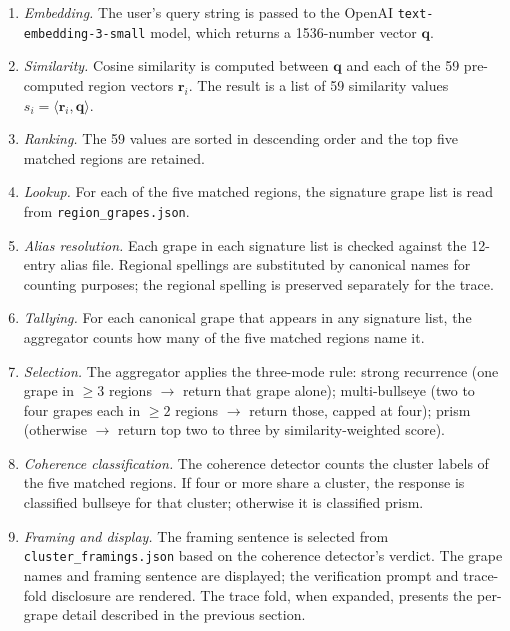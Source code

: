 \documentclass[11pt]{article}
\providecommand{\inner}[2]{\langle #1, #2 \rangle}
\begin{document}
\begin{enumerate}[leftmargin=2em,itemsep=0.2em]
\item \emph{Embedding.} The user's query string is passed to the OpenAI \texttt{text-embedding-3-small} model, which returns a 1536-number vector $\mathbf{q}$.

\item \emph{Similarity.} Cosine similarity is computed between $\mathbf{q}$ and each of the 59 pre-computed region vectors $\mathbf{r}_i$. The result is a list of 59 similarity values $s_i = \inner{\mathbf{r}_i}{\mathbf{q}}$.

\item \emph{Ranking.} The 59 values are sorted in descending order and the top five matched regions are retained.

\item \emph{Lookup.} For each of the five matched regions, the signature grape list is read from \texttt{region\_grapes.json}.

\item \emph{Alias resolution.} Each grape in each signature list is checked against the 12-entry alias file. Regional spellings are substituted by canonical names for counting purposes; the regional spelling is preserved separately for the trace.

\item \emph{Tallying.} For each canonical grape that appears in any signature list, the aggregator counts how many of the five matched regions name it.

\item \emph{Selection.} The aggregator applies the three-mode rule: strong recurrence (one grape in $\geq 3$ regions $\rightarrow$ return that grape alone); multi-bullseye (two to four grapes each in $\geq 2$ regions $\rightarrow$ return those, capped at four); prism (otherwise $\rightarrow$ return top two to three by similarity-weighted score).

\item \emph{Coherence classification.} The coherence detector counts the cluster labels of the five matched regions. If four or more share a cluster, the response is classified bullseye for that cluster; otherwise it is classified prism.

\item \emph{Framing and display.} The framing sentence is selected from \texttt{cluster\_framings.json} based on the coherence detector's verdict. The grape names and framing sentence are displayed; the verification prompt and trace-fold disclosure are rendered. The trace fold, when expanded, presents the per-grape detail described in the previous section.
\end{enumerate}
\end{document}
